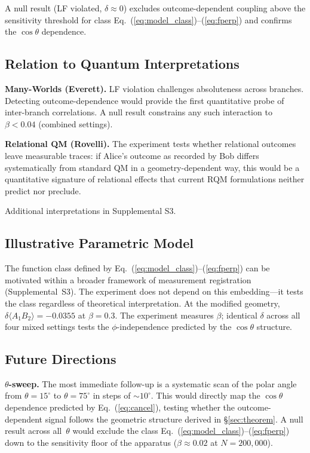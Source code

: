 \documentclass[twocolumn,aps,pra,superscriptaddress,floatfix,10pt]{revtex4-2}
\begin{document}
A null result (LF violated, $\delta \approx 0$) excludes
outcome-dependent coupling above the sensitivity threshold for class
Eq.~(\ref{eq:model_class})--(\ref{eq:fperp}) and confirms the
$\cos\theta$ dependence.

\subsection{Relation to Quantum Interpretations}

\textbf{Many-Worlds (Everett).} LF violation challenges absoluteness
across branches. Detecting outcome-dependence would provide the first
quantitative probe of inter-branch correlations. A null result
constrains any such interaction to $\beta < 0.04$ (combined settings).

\textbf{Relational QM (Rovelli).} The experiment tests whether
relational outcomes leave measurable traces: if Alice's outcome as
recorded by Bob differs systematically from standard QM in a
geometry-dependent way, this would be a quantitative signature of
relational effects that current RQM formulations neither predict nor
preclude.

Additional interpretations in Supplemental S3.

\subsection{Illustrative Parametric Model}

The function class defined by Eq.~(\ref{eq:model_class})--(\ref{eq:fperp})
can be motivated within a broader framework of measurement registration
(Supplemental~S3). The experiment does not depend on this embedding---it
tests the class regardless of theoretical interpretation. At the modified
geometry,
$\delta\langle A_1 B_2\rangle = -0.0355$ at $\beta = 0.3$. The
experiment measures $\beta$; identical $\delta$ across all four mixed
settings tests the $\phi$-independence predicted by the $\cos\theta$
structure.

\subsection{Future Directions}

\textbf{$\theta$-sweep.} The most immediate follow-up is a systematic
scan of the polar angle from $\theta = 15^\circ$ to $\theta = 75^\circ$
in steps of $\sim 10^\circ$. This would directly map the $\cos\theta$
dependence predicted by Eq.~(\ref{eq:cancel}), testing whether the
outcome-dependent signal follows the geometric structure derived in
\S\ref{sec:theorem}. A null result across all~$\theta$ would exclude
the class Eq.~(\ref{eq:model_class})--(\ref{eq:fperp}) down to the
sensitivity floor of the apparatus ($\beta \approx 0.02$ at
$N = 200{,}000$).
\end{document}
